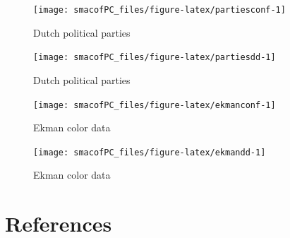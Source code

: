 \documentclass[
  12pt,
]{article}
\begin{document}
\begin{figure}

{\centering \texttt{[image: smacofPC\_files/figure-latex/partiesconf-1]} 

}

\caption{Dutch political parties}\label{fig:partiesconf}
\end{figure}

\begin{figure}

{\centering \texttt{[image: smacofPC\_files/figure-latex/partiesdd-1]} 

}

\caption{Dutch political parties}\label{fig:partiesdd}
\end{figure}

\begin{figure}

{\centering \texttt{[image: smacofPC\_files/figure-latex/ekmanconf-1]} 

}

\caption{Ekman color data}\label{fig:ekmanconf}
\end{figure}

\begin{figure}

{\centering \texttt{[image: smacofPC\_files/figure-latex/ekmandd-1]} 

}

\caption{Ekman color data}\label{fig:ekmandd}
\end{figure}

\section*{References}\label{references}
\end{document}
